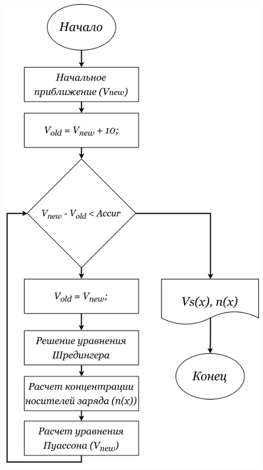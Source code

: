 \documentclass[10pt,pdf,hyperref={unicode},aspectratio={169}]{beamer}
\begin{document}
\begin{frame}
\begin{columns}
   	\includegraphics[width=\linewidth]{assets/ShPo}

\end{columns}
\end{frame}
\end{document}
